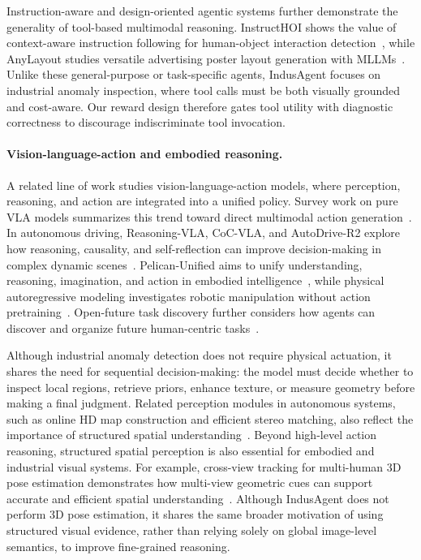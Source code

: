 \documentclass{llmxive}
\begin{document}
{Instruction-aware and design-oriented agentic systems further demonstrate the generality of tool-based multimodal reasoning. InstructHOI shows the value of context-aware instruction following for human-object interaction detection~\citep{luoinstructhoi}, while AnyLayout studies versatile advertising poster layout generation with MLLMs~\citep{anonymous2025anylayout}. Unlike these general-purpose or task-specific agents, IndusAgent focuses on industrial anomaly inspection, where tool calls must be both visually grounded and cost-aware. Our reward design therefore gates tool utility with diagnostic correctness to discourage indiscriminate tool invocation.

\paragraph{Vision-language-action and embodied reasoning.}
A related line of work studies vision-language-action models, where perception, reasoning, and action are integrated into a unified policy. Survey work on pure VLA models summarizes this trend toward direct multimodal action generation~\citep{zhang2025pure}. In autonomous driving, Reasoning-VLA, CoC-VLA, and AutoDrive-R2 explore how reasoning, causality, and self-reflection can improve decision-making in complex dynamic scenes~\citep{zhang2025reasoning, zhang2026coc, yuan2025autodrive}. Pelican-Unified aims to unify understanding, reasoning, imagination, and action in embodied intelligence~\citep{zhang2026pelican}, while physical autoregressive modeling investigates robotic manipulation without action pretraining~\citep{song2025physical}. Open-future task discovery further considers how agents can discover and organize future human-centric tasks~\citep{song2026human}. 

Although industrial anomaly detection does not require physical actuation, it shares the need for sequential decision-making: the model must decide whether to inspect local regions, retrieve priors, enhance texture, or measure geometry before making a final judgment. Related perception modules in autonomous systems, such as online HD map construction and efficient stereo matching, also reflect the importance of structured spatial understanding~\citep{zhang2025mapexpert, zhang2023ehss}. Beyond high-level action reasoning, structured spatial perception is also essential for embodied and industrial visual systems. For example, cross-view tracking for multi-human 3D pose estimation demonstrates how multi-view geometric cues can support accurate and efficient spatial understanding~\citep{chen2020cross}. Although IndusAgent does not perform 3D pose estimation, it shares the same broader motivation of using structured visual evidence, rather than relying solely on global image-level semantics, to improve fine-grained reasoning.

}
\end{document}
